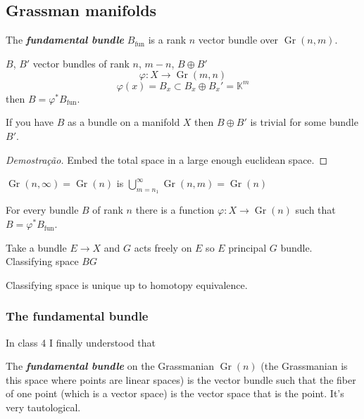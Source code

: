 \subsection{Grassman manifolds}

\begin{defn}
	The \textit{\textbf{fundamental bundle}} $B_{\operatorname{fun}}$ is a rank $n$ vector bundle over $\operatorname{Gr}(n,m)$.
\end{defn}

\begin{claim}
	$B$, $B'$ vector bundles of rank $n$, $m-n$, $B\oplus B'$
	\[\varphi:X\to \operatorname{Gr}(m,n)\]
	\[\varphi (x)=B_x\subset B_x\oplus B_x'=\mathbb{K}^m\]
	then $B=\varphi^* B_{\operatorname{fun}}$.
\end{claim}

\begin{thm}\leavevmode
	If you have $B$ as a bundle on a manifold $X$ then $B\oplus B'$ is trivial for some bundle $B'$.
\end{thm}

\begin{proof}[Demostra\c c\~ao]
	Embed the total space in a large enough euclidean space.
\end{proof}

\begin{defn}
	$\operatorname{Gr}(n,\infty)=\operatorname{Gr}(n)$ is $\bigcup_{m=n_1}^\infty\operatorname{Gr}(n,m)=\operatorname{Gr}(n) $
\end{defn}

\begin{coro}
	For every bundle  $B$ of rank $n$ there is a function $\varphi:X\to \operatorname{Gr}(n)$ such that $B=\varphi^*B_{\operatorname{fun}}$.
\end{coro}

Take a bundle $E\to X$ and $G$ acts freely on $E$ so $E$ principal $G$ bundle. Classifying space  $BG$

\begin{thm}\leavevmode
	Classifying space is unique up to homotopy equivalence.
\end{thm}

\subsubsection{The fundamental bundle}

In class 4 I finally understood that

\begin{defn}
	The \textit{\textbf{fundamental bundle}} on the Grassmanian  $\operatorname{Gr}(n)$ (the Grassmanian is this space where points are linear spaces) is the vector bundle such that the fiber of one point (which is a vector space) is the vector space that is the point. It's very tautological.
\end{defn}

